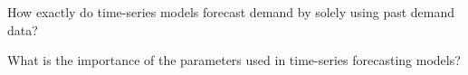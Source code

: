 \begin{exercise}
How exactly do time-series models forecast demand by solely using past demand data?

\end{exercise}

\begin{exercise}
What is the importance of the parameters used in time-series forecasting models?

\end{exercise}

